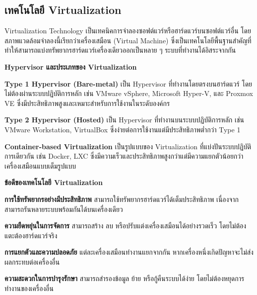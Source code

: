 \subsection{เทคโนโลยี Virtualization}

\hspace*{1.3em} %
Virtualization Technology เป็นเทคนิคการจำลองซอฟต์แวร์หรือฮาร์ดแวร์บนซอฟต์แวร์อื่น โดยสภาพแวดล้อมจำลองนี้เรียกว่าเครื่องเสมือน (Virtual Machine) ซึ่งเป็นเทคโนโลยีพื้นฐานสำคัญที่ทำให้สามารถแบ่งทรัพยากรฮาร์ดแวร์เครื่องเดียวออกเป็นหลาย ๆ ระบบที่ทำงานได้อิสระจากกัน \parencite{garcia2023hypervisor}

\hspace*{1.3em} %
\textbf{Hypervisor และประเภทของ Virtualization}
\begin{mycustomitem}
    \item \textbf{Type 1 Hypervisor (Bare-metal)} เป็น Hypervisor ที่ทำงานโดยตรงบนฮาร์ดแวร์ โดยไม่ต้องผ่านระบบปฏิบัติการหลัก เช่น VMware vSphere, Microsoft Hyper-V, และ Proxmox VE ซึ่งมีประสิทธิภาพสูงและเหมาะสำหรับการใช้งานในระดับองค์กร
    \item \textbf{Type 2 Hypervisor (Hosted)} เป็น Hypervisor ที่ทำงานบนระบบปฏิบัติการหลัก เช่น VMware Workstation, VirtualBox ซึ่งง่ายต่อการใช้งานแต่มีประสิทธิภาพต่ำกว่า Type 1
    \item \textbf{Container-based Virtualization} เป็นรูปแบบของ Virtualization ที่แบ่งปันระบบปฏิบัติการเดียวกัน เช่น Docker, LXC ซึ่งมีความเร็วและประสิทธิภาพสูงกว่าแต่มีความแยกตัวน้อยกว่าเครื่องเสมือนแบบเต็มรูปแบบ
\end{mycustomitem}

\hspace*{1.3em} %
\textbf{ข้อดีของเทคโนโลยี Virtualization}
\begin{mycustomitem}
    \item \textbf{การใช้ทรัพยากรอย่างมีประสิทธิภาพ} สามารถใช้ทรัพยากรฮาร์ดแวร์ได้เต็มประสิทธิภาพ เนื่องจากสามารถรันหลายระบบพร้อมกันได้บนเครื่องเดียว
    \item \textbf{ความยืดหยุ่นในการจัดการ} สามารถสร้าง ลบ หรือปรับแต่งเครื่องเสมือนได้อย่างรวดเร็ว โดยไม่ต้องแตะต้องฮาร์ดแวร์จริง
    \item \textbf{การแยกตัวและความปลอดภัย} แต่ละเครื่องเสมือนทำงานแยกจากกัน หากเครื่องหนึ่งเกิดปัญหาจะไม่ส่งผลกระทบต่อเครื่องอื่น
    \item \textbf{ความสะดวกในการบำรุงรักษา} สามารถสำรองข้อมูล ย้าย หรือกู้คืนระบบได้ง่าย โดยไม่ต้องหยุดการทำงานของเครื่องอื่น
\end{mycustomitem}


